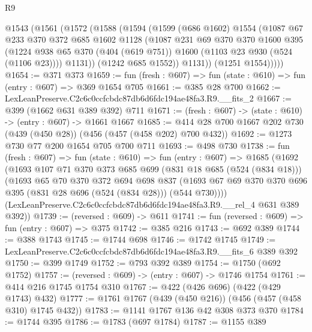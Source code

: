 \begin{lexlean}{R9}
\begin{coremodule}
      @1543
        (@1561
          (@1572
            (@1588
              (@1594
                (@1599
                  (@686 @1602)
                  @1554
                  (@1087
                    @67
                    @233
                    @370
                    @372
                    @685
                    @1602
                    @1128
                    (@1087
                      @231
                      @69
                      @370
                      @370
                      @1600
                      @395
                      (@1224
                        @938
                        @65
                        @370
                        (@404 (@619 @751))
                        @1600
                        (@1103 @23 @930 (@524 (@1106 @23))))
                      @1131))
                  (@1242 @685 @1552))
                @1131))
            (@1251 @1554)))))
@1654 := @371 @373
@1659 := fun (fresh : @607) => fun (state : @610) => fun (entry : @607) => @369 @1654 @705
@1661 := @385 @28 @700
@1662 := LexLeanPreserve.C2c6c0ccfcbdc87db6d6fdc194ae48fa3.R9.__fits_2
@1667 := @399 (@1662 @631 @389 @392) @711
@1671 := (fresh : @607) -> (state : @610) -> (entry : @607) -> @1661 @1667
@1685 := @414 @28 @700 @1667 @202 @730 (@439 (@450 @28)) (@456 (@457 (@458 @202) @700 @432))
@1692 := @1273 @730 @77 @200 @1654 @705 @700 @711
@1693 := @498 @730
@1738 := fun (fresh : @607) =>
  fun (state : @610) =>
  fun (entry : @607) =>
  @1685
    (@1692
      (@1693
        @107
        @71
        @370
        @373
        @685
        @699
        (@831 @18 @685 (@524 (@834 @18)))
        (@1693
          @65
          @70
          @370
          @372
          @694
          @698
          @837
          (@1693 @67 @69 @370 @370 @696 @395 (@831 @28 @696 (@524 (@834 @28))) (@544 @730))))
      (LexLeanPreserve.C2c6c0ccfcbdc87db6d6fdc194ae48fa3.R9.__rel_4 @631 @389 @392))
@1739 := (reversed : @609) -> @611
@1741 := fun (reversed : @609) => fun (entry : @607) => @375
@1742 := @385 @216
@1743 := @692 @389
@1744 := @388 @1743
@1745 := @1744 @698
@1746 := @1742 @1745
@1749 := LexLeanPreserve.C2c6c0ccfcbdc87db6d6fdc194ae48fa3.R9.__fits_6 @389 @392
@1750 := @399 @1749
@1752 := @793 @392 @389
@1754 := @1750 (@692 @1752)
@1757 := (reversed : @609) -> (entry : @607) -> @1746 @1754
@1761 := @414 @216 @1745 @1754 @310
@1767 := @422 (@426 @696) (@422 (@429 @1743) @432)
@1777 := @1761 @1767 (@439 (@450 @216)) (@456 (@457 (@458 @310) @1745 @432))
@1783 := @1141 @1767 @136 @42 @308 @373 @370
@1784 := @1744 @395
@1786 := @1783 (@697 @1784)
@1787 := @1155 @389

\end{coremodule}
\end{lexlean}

